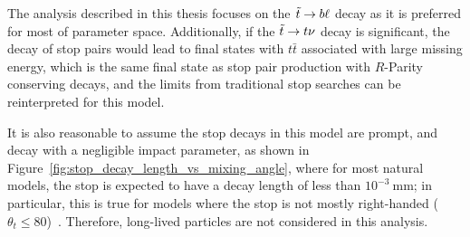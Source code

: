 \begin{figure}[ht]
\end{figure}

The analysis described in this thesis focuses on the $\tilde{t} \rightarrow b\ell$ decay
as it is preferred for most of parameter space.
Additionally, if the $\tilde{t} \rightarrow t\nu$ decay is significant, the decay of stop
pairs would lead to final states with $t\bar{t}$ associated with large missing
energy, which is the same final state as stop pair production with
$R$-Parity conserving decays, and the limits from traditional stop searches can
be reinterpreted for this model.

It is also reasonable to assume the stop decays in this model are prompt, and
decay with a negligible impact parameter, as shown in
Figure~\ref{fig:stop_decay_length_vs_mixing_angle}, where for most natural
models, the stop is expected to have a decay length of less than
$10^{-3}~\mathrm{mm}$;
in particular, this is true for models where the stop is not mostly
right-handed ($\theta_t \leq 80$)~\cite{Marshall:2014cwa,Marshall:2014kea}.
Therefore, long-lived particles are not considered in this analysis.

